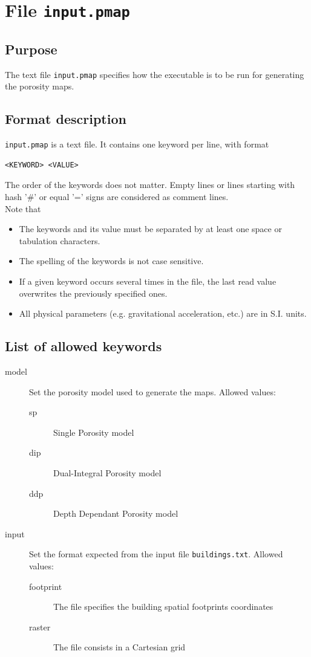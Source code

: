 \section{File \texttt{input.pmap}}
\subsection{Purpose}
The text file \texttt{input.pmap} specifies how the \swPorosityMapper executable is to be run for generating the porosity maps. 

\subsection{Format description}
\texttt{input.pmap} is a text file. It contains one keyword per line, with format
\begin{lstlisting}
<KEYWORD> <VALUE>
\end{lstlisting}
The order of the keywords does not matter. Empty lines or lines starting with hash '\#' or equal '=' signs are considered as comment lines.\\
Note that
\begin{itemize}
\item The keywords and its value must be separated by at least one space or tabulation characters.
\item The spelling of the keywords is not case sensitive.\\
\item If a given keyword occurs several times in the file, the last read value overwrites the previously specified ones.
\item All physical parameters (e.g. gravitational acceleration, etc.) are in S.I. units.
\end{itemize}

\subsection{List of allowed keywords}

\begin{description}

\item[model]  Set the porosity model used to generate the maps. Allowed values:
\begin{description}
\item[sp] Single Porosity model
\item[dip] Dual-Integral Porosity model
\item[ddp] Depth Dependant Porosity model
\end{description}

\item[input]  Set the format expected from the input file \texttt{buildings.txt}. Allowed values:
\begin{description}
\item[footprint] The file specifies the building spatial footprints coordinates
\item[raster] The file consists in a Cartesian grid
\end{description}

\end{description}


